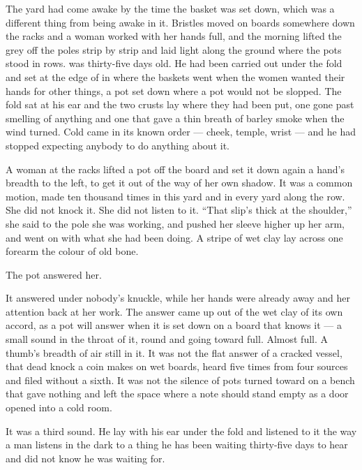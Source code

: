 
The yard had come awake by the time the basket was set down, which was a different thing from being awake in it. Bristles moved on boards somewhere down the racks and a woman worked with her hands full, and the morning lifted the grey off the poles strip by strip and laid light along the ground where the pots stood in rows.  was thirty-five days old. He had been carried out under the fold and set at the edge of  in  where the baskets went when the women wanted their hands for other things, a pot set down where a pot would not be slopped. The fold sat at his ear and the two crusts lay where they had been put, one gone past smelling of anything and one that gave a thin breath of barley smoke when the wind turned. Cold came in its known order --- cheek, temple, wrist --- and he had stopped expecting anybody to do anything about it.

A woman at the racks lifted a pot off the board and set it down again a hand's breadth to the left, to get it out of the way of her own shadow. It was a common motion, made ten thousand times in this yard and in every yard along the row. She did not knock it. She did not listen to it. “That slip's thick at the shoulder,” she said to the pole she was working, and pushed her sleeve higher up her arm, and went on with what she had been doing. A stripe of wet clay lay across one forearm the colour of old bone.

The pot answered her.

It answered under nobody's knuckle, while her hands were already away and her attention back at her work. The answer came up out of the wet clay of its own accord, as a pot will answer when it is set down on a board that knows it --- a small sound in the throat of it, round and going toward full. Almost full. A thumb's breadth of air still in it. It was not the flat answer of a cracked vessel, that dead knock a coin makes on wet boards, heard five times from four sources and filed without a sixth. It was not the silence of pots turned toward on a bench that gave nothing and left the space where a note should stand empty as a door opened into a cold room.

It was a third sound. He lay with his ear under the fold and listened to it the way a man listens in the dark to a thing he has been waiting thirty-five days to hear and did not know he was waiting for.

